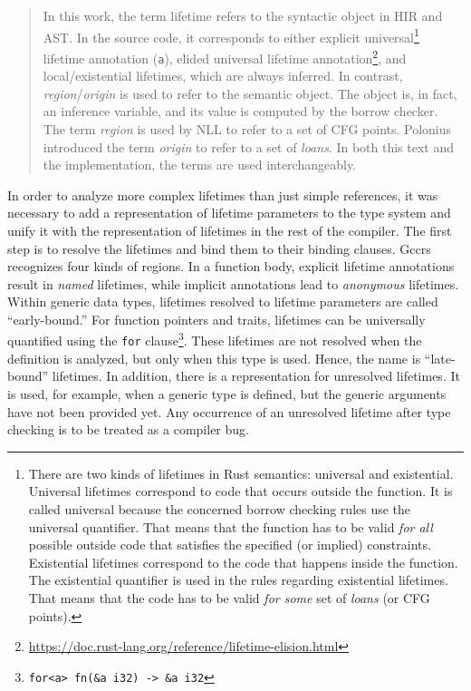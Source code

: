 \documentclass[
  11pt,
  twoside,symmetric]{report}
\DeclareRobustCommand{\href}[2]{#2\footnote{\url{#1}}}
\begin{document}
\begin{quote}
In this work, the term lifetime refers to the syntactic object in HIR
and AST. In the source code, it corresponds to either explicit
universal\footnote{There are two kinds of lifetimes in Rust semantics:
  universal and existential. Universal lifetimes correspond to code that
  occurs outside the function. It is called universal because the
  concerned borrow checking rules use the universal quantifier. That
  means that the function has to be valid \emph{for all} possible
  outside code that satisfies the specified (or implied) constraints.
  Existential lifetimes correspond to the code that happens inside the
  function. The existential quantifier is used in the rules regarding
  existential lifetimes. That means that the code has to be valid
  \emph{for some} set of \emph{loans} (or CFG points).} lifetime
annotation (\texttt{\textquotesingle{}a}), elided universal lifetime
annotation\href{https://doc.rust-lang.org/reference/lifetime-elision.html}{\citeproc{ref-reference}{{[}14{]}}},
and local/existential lifetimes, which are always inferred. In contrast,
\emph{region}/\emph{origin} is used to refer to the semantic object. The
object is, in fact, an inference variable, and its value is computed by
the borrow checker. The term \emph{region} is used by NLL to refer to a
set of CFG points. Polonius introduced the term \emph{origin} to refer
to a set of \emph{loans}. In both this text and the implementation, the
terms are used interchangeably.
\end{quote}

In order to analyze more complex lifetimes than just simple references,
it was necessary to add a representation of lifetime parameters to the
type system and unify it with the representation of lifetimes in the
rest of the compiler. The first step is to resolve the lifetimes and
bind them to their binding clauses. Gccrs recognizes four kinds of
regions. In a function body, explicit lifetime annotations result in
\emph{named} lifetimes, while implicit annotations lead to
\emph{anonymous} lifetimes. Within generic data types, lifetimes
resolved to lifetime parameters are called ``early-bound.'' For function
pointers and traits, lifetimes can be universally quantified using the
\texttt{for} clause\footnote{\texttt{for\textless{}\textquotesingle{}a\textgreater{}\ fn(\&\textquotesingle{}a\ i32)\ -\textgreater{}\ \&\textquotesingle{}a\ i32}}.
These lifetimes are not resolved when the definition is analyzed, but
only when this type is used. Hence, the name is ``late-bound''
lifetimes. In addition, there is a representation for unresolved
lifetimes. It is used, for example, when a generic type is defined, but
the generic arguments have not been provided yet. Any occurrence of an
unresolved lifetime after type checking is to be treated as a compiler
bug.
\end{document}
